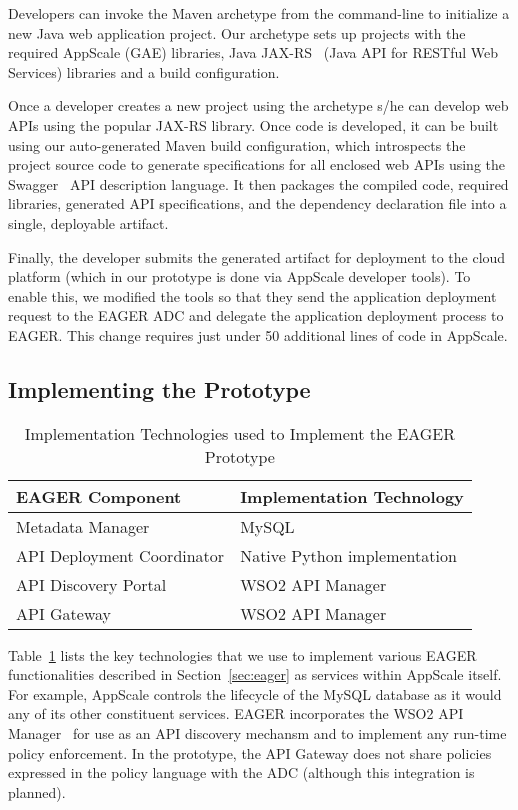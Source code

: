 Developers can invoke the Maven archetype from the command-line to initialize
a new Java web application project. Our archetype sets up projects with the
required AppScale (GAE) libraries, Java JAX-RS~\cite{jaxrs} (Java API for RESTful Web
Services) libraries and a build configuration.

Once a developer creates a new project using the archetype s/he can develop
web APIs using the popular JAX-RS library. Once code is developed, it can be built
using our auto-generated Maven build configuration, which introspects the
project source code to generate specifications for all enclosed web APIs using
the Swagger~\cite{swagger} API description language. 
It then packages the compiled
code, required libraries, generated API specifications, and the dependency
declaration file into a single, deployable artifact.

Finally, the developer submits the generated artifact for deployment to the
cloud platform (which in our prototype is done via AppScale developer tools). 
To enable this, we modified the tools so that they
send the application deployment request to the EAGER ADC and
delegate the application deployment process to EAGER. This change requires
just under 50 additional lines of code in AppScale.


\subsection{Implementing the Prototype}

\begin{table}[t]
\begin{center}
\begin{tabular}{| p{3cm} | p{3.5cm} |}
\hline
EAGER Component & Implementation Technology\\ \hline
Metadata Manager & MySQL~\cite{mysql}\\
API Deployment Coordinator & Native Python implementation\\
API Discovery Portal & WSO2 API Manager~\cite{wso2am}\\
API Gateway & WSO2 API Manager\\
\hline
\end{tabular}
\end{center}
\caption{Implementation Technologies used to Implement the EAGER Prototype}
\label{tab:imp-tech}
\end{table}

Table~\ref{tab:imp-tech} lists the key technologies that we use to implement 
various EAGER functionalities described in
Section~\ref{sec:eager} as services within AppScale itself.  For example, AppScale
controls the lifecycle of the MySQL database as it would any of its other
constituent services.  EAGER incorporates the WSO2 API Manager~\cite{wso2am} for
use as an API discovery mechansm and to implement any run-time policy 
enforcement.  In the prototype, the API Gateway does not share policies
expressed in the policy language with the ADC (although this integration is
planned).

